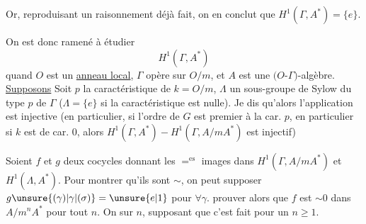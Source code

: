 Or, reproduisant un raisonnement déjà fait, on en conclut que $H^1(\Gamma,A^*)=\{e\}$.

On est donc ramené à étudier
\[
H^1(\Gamma,A^*)
\]
quand $O$ est un \uline{anneau local}, $\Gamma$ opère \uline{} sur $O/m$, et $A$ est une $(O$-$\Gamma)$-algèbre. \uline{Supposons}   Soit $p$ la caractéristique de $k=O/m$, $\Lambda$ un sous-groupe de Sylow du type $p$ de $\Gamma$ ($\Lambda=\{e\}$ si la caractéristique est nulle).
Je dis qu'alors l'application
est  injective (en particulier, si l'ordre de $G$ est premier à la car. $p$, en particulier si $k$ est de car. $0$, alors $H^1(\Gamma,A^*)\mathbin{-}H^1(\Gamma,A/mA^*)$ est injectif)

Soient $f$ et $g$  deux cocycles donnant les $=^{\mathrm{es}}$ images dans $H^1(\Gamma,A/mA^*)$ et $H^1(\Lambda,A^*)$. Pour montrer qu'ils sont $\sim$, on peut  supposer $g\unsure{(\gamma)|\gamma|(\sigma)}=\unsure{e|1}$ pour $\forall\gamma$.   prouver alors  que $f$ est $\sim0$ dans  $A/m^n A^*$ pour tout $n$. On  sur $n$, supposant que c'est fait pour un $n\geq1$.
